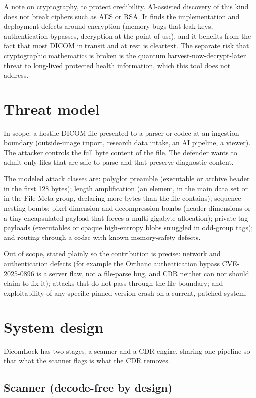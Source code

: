 \documentclass[11pt]{article}
\begin{document}
A note on cryptography, to protect credibility. AI-assisted discovery of this kind does not break ciphers such as AES or RSA. It finds the implementation and deployment defects around encryption (memory bugs that leak keys, authentication bypasses, decryption at the point of use), and it benefits from the fact that most DICOM in transit and at rest is cleartext. The separate risk that cryptographic mathematics is broken is the quantum harvest-now-decrypt-later threat to long-lived protected health information, which this tool does not address.

\section{Threat model}

In scope: a hostile DICOM file presented to a parser or codec at an ingestion boundary (outside-image import, research data intake, an AI pipeline, a viewer). The attacker controls the full byte content of the file. The defender wants to admit only files that are safe to parse and that preserve diagnostic content.

The modeled attack classes are: polyglot preamble (executable or archive header in the first 128 bytes); length amplification (an element, in the main data set or in the File Meta group, declaring more bytes than the file contains); sequence-nesting bombs; pixel dimension and decompression bombs (header dimensions or a tiny encapsulated payload that forces a multi-gigabyte allocation); private-tag payloads (executables or opaque high-entropy blobs smuggled in odd-group tags); and routing through a codec with known memory-safety defects.

Out of scope, stated plainly so the contribution is precise: network and authentication defects (for example the Orthanc authentication bypass CVE-2025-0896 \cite{ref8} is a server flaw, not a file-parse bug, and CDR neither can nor should claim to fix it); attacks that do not pass through the file boundary; and exploitability of any specific pinned-version crash on a current, patched system.

\section{System design}

DicomLock has two stages, a scanner and a CDR engine, sharing one pipeline so that what the scanner flags is what the CDR removes.

\subsection{Scanner (decode-free by design)}
\end{document}
